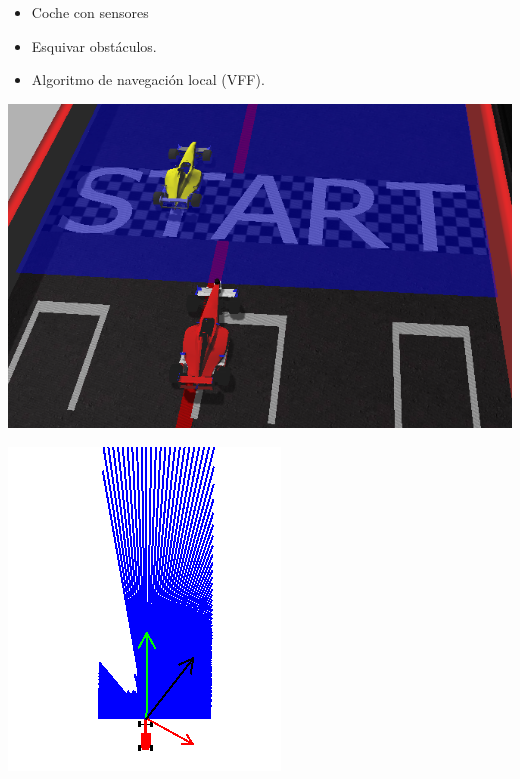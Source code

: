 \documentclass[notes,slidesec,a4]{seminar}
\begin{document}
\begin{hslide}
	\begin{itemize}
		\item Coche con sensores 
		\item Esquivar obstáculos.
		\item Algoritmo de navegación local (VFF).
	\end{itemize}
	\begin{center}
		\begin{minipage}[t]{0.55\textwidth}
			\includegraphics[width=\textwidth]{vff-gazebo.png}
		\end{minipage}
		\begin{minipage}[t]{0.25\textwidth}
			\includegraphics[width=\textwidth]{vff-gui.png}
		\end{minipage}
	\end{center}
\end{hslide}
\end{document}
